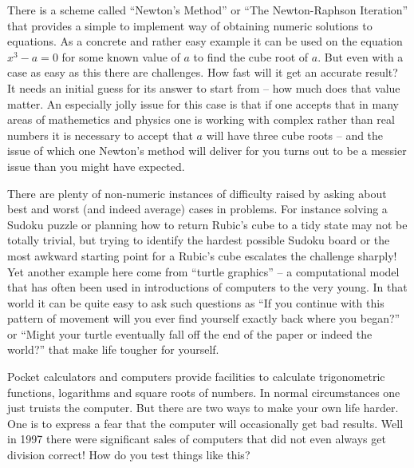 \begin{longdescription}
There is a scheme called ``Newton's Method'' or ``The Newton-Raphson 
Iteration'' that provides a simple to implement way of obtaining numeric
solutions to equations. As a concrete and rather easy example it can be 
used on the equation $x^3-a=0$ for some known value of $a$ to find the
cube root of $a$. But even with a case as easy as this there are challenges.
How fast will it get an accurate result? It needs an initial guess for its
answer to start from -- how much does that value matter. An especially
jolly issue for this case is that if one accepts that in many areas of 
mathemetics and physics one is working with complex rather than real 
numbers it is necessary to accept that $a$ will have three cube roots -- and
the issue of which one Newton's method will deliver for you turns out to 
be a messier issue than you might have expected.

There are plenty of non-numeric instances of difficulty raised by asking
about best and worst (and indeed average) cases in problems. For instance
solving a Sudoku puzzle or planning how to return Rubic's cube to a tidy
state may not be totally trivial, but trying to identify the hardest 
possible Sudoku board or the most awkward starting point for a Rubic's 
cube escalates the challenge sharply!
Yet another example here come from ``turtle graphics'' -- a computational 
model that has often been used in introductions of computers to the very 
young. In that world it can be quite easy to ask such questions as ``If you 
continue with this pattern of movement will you ever find yourself exactly 
back where you began?'' or ``Might your turtle eventually fall off the end 
of the paper or indeed the world?'' that make life tougher for yourself.


\item[Insist on total correctness in every case.]

Pocket calculators and computers provide facilities to calculate 
trigonometric functions, logarithms and square roots of numbers. In normal
circumstances one just truists the computer. But there are two ways to
make your own life harder. One is to express a fear that the computer will
occasionally get bad results. Well in 1997 there were significant sales of 
computers that did not even always get division correct! How do you test
things like this?


\end{longdescription}
